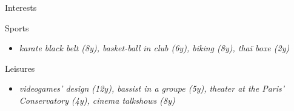 \vspace{4mm}
\hspace*{-2mm}
{\fontsize{16}{10}\selectfont \hspace{1.5mm} Interests}
\newline \newline

\vspace{-8mm}
\hspace{-2mm}
{\fontsize{12}{10}\selectfont \hspace{3.8mm} Sports}\newline
\vspace{-6mm}
\begin{itemize}
    \item[\tiny\ding{110}] \textit{karate black belt (8y), basket-ball in club (6y), biking (8y), thaï boxe (2y)}
\end{itemize}

\hspace{-2mm}
\vspace{-6mm}
{\fontsize{12}{10}\selectfont \hspace{3.8mm} Leisures}\newline
\begin{itemize}
    \item[\tiny\ding{110}] \textit{videogames' design (12y), bassist in a groupe (5y), theater at the Paris' Conservatory (4y), cinema talkshows (8y)}
\end{itemize}
\vspace{2mm}
